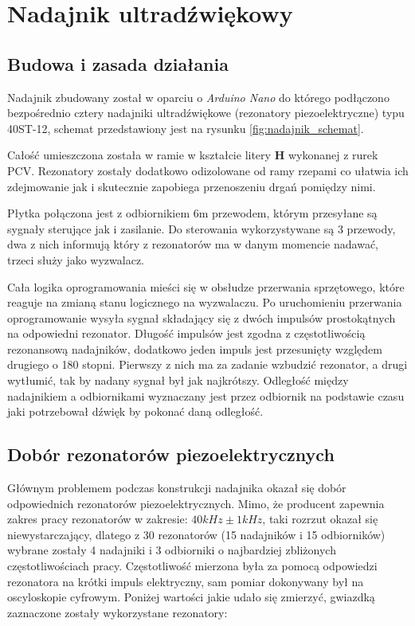 \chapter{Nadajnik ultradźwiękowy}
\section{Budowa i zasada działania}

Nadajnik zbudowany został w oparciu o \textit{Arduino Nano} \cite{arduinoNano} do którego podłączono 
bezpośrednio cztery nadajniki ultradźwiękowe (rezonatory piezoelektryczne) typu 40ST-12, schemat 
przedstawiony jest na rysunku \ref{fig:nadajnik_schemat}.



Całość umieszczona została w ramie w kształcie litery \textbf{H} wykonanej z rurek PCV.
Rezonatory zostały dodatkowo odizolowane od ramy rzepami co ułatwia ich zdejmowanie jak i skutecznie
zapobiega przenoszeniu drgań pomiędzy nimi.



Płytka połączona jest z odbiornikiem 6m przewodem, którym przesyłane są sygnały sterujące jak i zasilanie.
Do sterowania wykorzystywane są 3 przewody, dwa z nich informują który z rezonatorów ma w danym momencie nadawać,
trzeci służy jako wyzwalacz.

Cała logika oprogramowania mieści się w obsłudze przerwania sprzętowego, które reaguje na zmianą stanu logicznego
na wyzwalaczu. Po uruchomieniu przerwania oprogramowanie wysyła sygnał składający się z dwóch impulsów prostokątnych
na odpowiedni rezonator. Długość impulsów jest zgodna z częstotliwością rezonansową nadajników, dodatkowo jeden
impuls jest przesunięty względem drugiego o 180 stopni. Pierwszy z nich ma za zadanie wzbudzić rezonator, a drugi wytłumić, 
tak by nadany sygnał był jak najkrótszy. Odległość między nadajnikiem a odbiornikami wyznaczany jest przez odbiornik na podstawie
czasu jaki potrzebował dźwięk by pokonać daną odległość.

\section{Dobór rezonatorów piezoelektrycznych}
Głównym problemem podczas konstrukcji nadajnika okazał się dobór odpowiednich rezonatorów piezoelektrycznych.
Mimo, że producent zapewnia zakres pracy rezonatorów w zakresie: $40 kHz \pm 1kHz$, taki rozrzut okazał się niewystarczający, 
dlatego z 30 rezonatorów (15 nadajników i 15 odbiorników) wybrane zostały 4 nadajniki i 3 odbiorniki o najbardziej 
zbliżonych częstotliwościach pracy. Częstotliwość mierzona była za pomocą odpowiedzi rezonatora na 
krótki impuls elektryczny, sam pomiar dokonywany był na oscyloskopie cyfrowym. Poniżej wartości jakie udało się zmierzyć,
gwiazdką zaznaczone zostały wykorzystane rezonatory:

